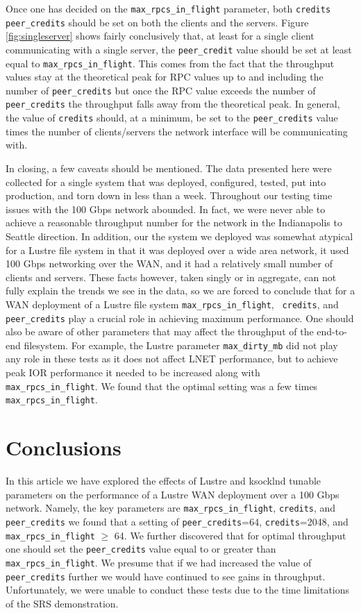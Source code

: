 \documentclass[]{sigplan-proc}
\begin{document}
Once one has decided on the {\tt max\_rpcs\_in\_flight} parameter, both {\tt credits} {\tt peer\_credits}
should be set on both the clients and the servers. Figure \ref{fig:singleserver} shows fairly conclusively
that, at least for a single client communicating with a single server, the {\tt peer\_credit} value should be
set at least equal to {\tt max\_rpcs\_in\_flight}. This comes from the fact that the throughput values stay at
the theoretical peak for RPC values up to and including the number of {\tt peer\_credits} but once the RPC
value exceeds the number of {\tt peer\_credits} the throughput falls away from the theoretical peak. In
general, the value of {\tt credits} should, at a minimum, be set to the {\tt peer\_credits} value times the number of
clients/servers the network interface will be communicating with.

In closing, a few caveats should be mentioned. The data presented here were collected for a single system that
was deployed, configured, tested, put into production, and torn down in less than a week. Throughout our
testing time issues with the 100 Gbps network abounded. In fact, we were never able to achieve a reasonable
throughput number for the network in the Indianapolis to Seattle direction. In addition, our the system we
deployed was somewhat atypical for a Lustre file system in that it was deployed over a wide area network, it
used 100 Gbps networking over the WAN, and it had a relatively small number of clients and servers. These
facts however, taken singly or in aggregate, can not fully explain the trends we see in the data, so we are
forced to conclude that for a WAN deployment of a Lustre file system {\tt max\_rpcs\_in\_flight}, {\tt
  credits}, and {\tt peer\_credits} play a crucial role in achieving maximum performance. One should also be
aware of other parameters that may affect the throughput of the end-to-end filesystem. For example, the Lustre
parameter {\tt max\_dirty\_mb} did not play any role in these tests as it does not affect LNET performance,
but to achieve peak IOR performance it needed to be increased along with {\tt max\_rpcs\_in\_flight}. We found
that the optimal setting was a few times {\tt max\_rpcs\_in\_flight}.

\section{Conclusions}\label{sec:conclusion}

In this article we have explored the effects of Lustre and ksocklnd tunable parameters on the performance of a
Lustre WAN deployment over a 100 Gbps network. Namely, the key parameters are {\tt max\_rpcs\_in\_flight},
{\tt credits}, and {\tt peer\_credits} we found that a setting of {\tt peer\_credits}=64, {\tt credits}=2048,
and {\tt max\_rpcs\_in\_flight} $\geq$ 64. We further discovered that for optimal throughput one should set
the {\tt peer\_credits} value equal to or greater than {\tt max\_rpcs\_in\_flight}. We presume that if we had
increased the value of {\tt peer\_credits} further we would have continued to see gains in
throughput. Unfortunately, we were unable to conduct these tests due to the time limitations of the SRS
demonstration.
\end{document}
